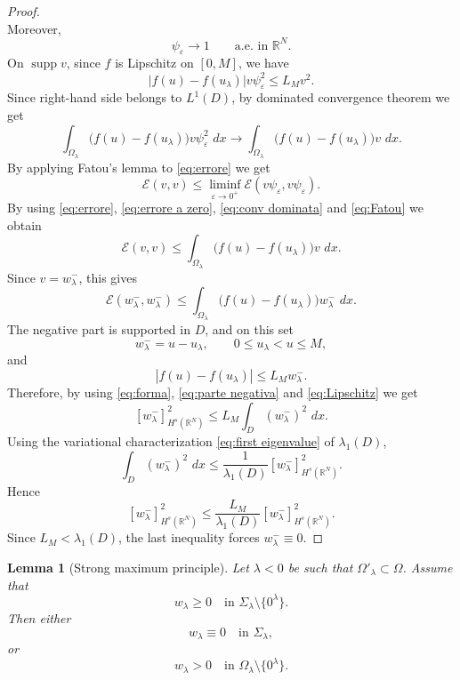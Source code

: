\documentclass[11pt,a4paper]{article}
\newtheorem{lemma}[theorem]{Lemma}
\newcommand{\R}{\mathbb R}
\newcommand{\dd}{\,d}
\begin{document}
\begin{proof}
\begin{equation}
\end{equation}
Moreover,
\[
\psi_\varepsilon\to1
\qquad\text{a.e. in }\mathbb R^N.
\]
On \(\operatorname{supp}v\), since \(f\) is Lipschitz on \([0,M]\), we have
\[
\bigl|
f(u)-f(u_\lambda)
\bigr|v\psi_\varepsilon^2
\le
L_Mv^2.
\]
Since right-hand side belongs to \(L^1(D)\), by dominated convergence theorem we get
\begin{equation}\label{eq:conv dominata}
\int_{\Omega_\lambda}
\bigl(f(u)-f(u_\lambda)\bigr)
v\psi_\varepsilon^2\,\dd x
\longrightarrow
\int_{\Omega_\lambda}
\bigl(f(u)-f(u_\lambda)\bigr)
v\,\dd x.
\end{equation}
By applying Fatou's lemma to \eqref{eq:errore} we get
\begin{equation}\label{eq:Fatou}
\mathcal E(v,v)
\le
\liminf_{\varepsilon\to0^+}
\mathcal E(v\psi_\varepsilon,v\psi_\varepsilon).
\end{equation}
By using \eqref{eq:errore}, \eqref{eq:errore a zero}, \eqref{eq:conv dominata} and \eqref{eq:Fatou} we obtain
\[
\mathcal E(v,v)
\le
\int_{\Omega_\lambda}
\bigl(f(u)-f(u_\lambda)\bigr)v\,\dd x.
\]
Since \(v=w_\lambda^-\), this gives
\begin{equation}\label{eq:forma}
\mathcal E(w_\lambda^-,w_\lambda^-)
\le
\int_{\Omega_\lambda}
\bigl(f(u)-f(u_\lambda)\bigr)w_\lambda^-\,\dd x.
\end{equation}
The negative part is supported in \(D\), and on this set
\begin{equation}\label{eq:parte negativa}
w_\lambda^-=u-u_\lambda,
\qquad
0\le u_\lambda<u\le M,
\end{equation}
and
\begin{equation}\label{eq:Lipschitz}
|f(u)-f(u_\lambda)|
\le
L_M w_\lambda^-.
\end{equation}
Therefore, by using \eqref{eq:forma}, \eqref{eq:parte negativa} and \eqref{eq:Lipschitz} we get
\[
[w_\lambda^-]_{H^s(\R^N)}^2
\le
L_M\int_D (w_\lambda^-)^2\,\dd x.
\]
Using the variational characterization \eqref{eq:first eigenvalue} of \(\lambda_1(D)\),
\[
\int_D (w_\lambda^-)^2\,\dd x
\le
\frac1{\lambda_1(D)}
[w_\lambda^-]_{H^s(\R^N)}^2.
\]
Hence
\[
[w_\lambda^-]_{H^s(\R^N)}^2
\le
\frac{L_M}{\lambda_1(D)}
[w_\lambda^-]_{H^s(\R^N)}^2.
\]
Since \(L_M<\lambda_1(D)\), the last inequality forces \(w_\lambda^-\equiv0\).
\end{proof}

\begin{lemma}[Strong maximum principle]\label{strong maximum principle}
Let \(\lambda<0\) be such that \( \Omega'_{\lambda} \subset \Omega\). Assume that
\[
w_\lambda\ge0
\quad\text{in }\Sigma_\lambda\setminus\{0^\lambda\}.
\]
Then either
\[
w_\lambda\equiv0
\quad\text{in }\Sigma_\lambda,
\]
or
\[
w_\lambda>0
\quad\text{in }\Omega_\lambda\setminus\{0^\lambda\}.
\]
\end{lemma}
\end{document}
